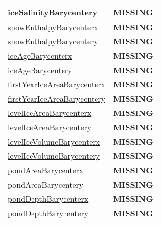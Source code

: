 {\begin{center}
\begin{longtable}{| p{2.0in} | p{4.0in} |}
    \hline
    \hyperref[subsec:var_sec_tracer_barycenter_iceSalinityBarycentery]{iceSalinityBarycentery} & {\bf \color{red} MISSING} \\
    \hline
    \hyperref[subsec:var_sec_tracer_barycenter_snowEnthalpyBarycenterx]{snowEnthalpyBarycenterx} & {\bf \color{red} MISSING} \\
    \hline
    \hyperref[subsec:var_sec_tracer_barycenter_snowEnthalpyBarycentery]{snowEnthalpyBarycentery} & {\bf \color{red} MISSING} \\
    \hline
    \hyperref[subsec:var_sec_tracer_barycenter_iceAgeBarycenterx]{iceAgeBarycenterx} & {\bf \color{red} MISSING} \\
    \hline
    \hyperref[subsec:var_sec_tracer_barycenter_iceAgeBarycentery]{iceAgeBarycentery} & {\bf \color{red} MISSING} \\
    \hline
    \hyperref[subsec:var_sec_tracer_barycenter_firstYearIceAreaBarycenterx]{firstYearIceAreaBarycenterx} & {\bf \color{red} MISSING} \\
    \hline
    \hyperref[subsec:var_sec_tracer_barycenter_firstYearIceAreaBarycentery]{firstYearIceAreaBarycentery} & {\bf \color{red} MISSING} \\
    \hline
    \hyperref[subsec:var_sec_tracer_barycenter_levelIceAreaBarycenterx]{levelIceAreaBarycenterx} & {\bf \color{red} MISSING} \\
    \hline
    \hyperref[subsec:var_sec_tracer_barycenter_levelIceAreaBarycentery]{levelIceAreaBarycentery} & {\bf \color{red} MISSING} \\
    \hline
    \hyperref[subsec:var_sec_tracer_barycenter_levelIceVolumeBarycenterx]{levelIceVolumeBarycenterx} & {\bf \color{red} MISSING} \\
    \hline
    \hyperref[subsec:var_sec_tracer_barycenter_levelIceVolumeBarycentery]{levelIceVolumeBarycentery} & {\bf \color{red} MISSING} \\
    \hline
    \hyperref[subsec:var_sec_tracer_barycenter_pondAreaBarycenterx]{pondAreaBarycenterx} & {\bf \color{red} MISSING} \\
    \hline
    \hyperref[subsec:var_sec_tracer_barycenter_pondAreaBarycentery]{pondAreaBarycentery} & {\bf \color{red} MISSING} \\
    \hline
    \hyperref[subsec:var_sec_tracer_barycenter_pondDepthBarycenterx]{pondDepthBarycenterx} & {\bf \color{red} MISSING} \\
    \hline
    \hyperref[subsec:var_sec_tracer_barycenter_pondDepthBarycentery]{pondDepthBarycentery} & {\bf \color{red} MISSING} \\

\end{longtable}
\end{center}}
